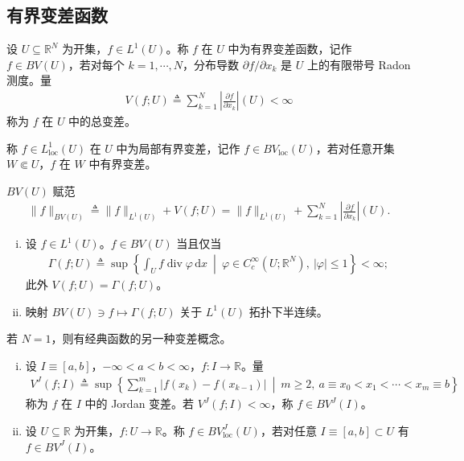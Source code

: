 \documentclass[../../main.tex]{subfiles}%
\begin{document}
\subsection{有界变差函数}\label{subsection:ch03-BV}

\begin{definition}\label{definition:ch03-BV}
设 $U\subseteq\mathbb{R}^N$ 为开集，$f\in L^1(U)$。称 $f$ 在 $U$ 中为有界变差函数，记作 $f\in BV(U)$，若对每个 $k=1,\cdots ,N$，分布导数 $\partial f/\partial x_k$ 是 $U$ 上的有限带号 Radon 测度。量
\begin{align}
V(f;U)\triangleq \sum_{k=1}^N\left|\frac{\partial f}{\partial x_k}\right|(U)<\infty\label{align:ch03-3.13}
\end{align}
称为 $f$ 在 $U$ 中的总变差。

称 $f\in L^1_{\mathrm{loc}}(U)$ 在 $U$ 中为局部有界变差，记作 $f\in BV_{\mathrm{loc}}(U)$，若对任意开集 $W\Subset U$，$f$ 在 $W$ 中有界变差。

$BV(U)$ 赋范
\begin{align*}
\|f\|_{BV(U)}\triangleq \|f\|_{L^1(U)}+V(f;U)
=\|f\|_{L^1(U)}+\sum_{k=1}^N\left|\frac{\partial f}{\partial x_k}\right|(U).
\end{align*}
\end{definition}

\begin{remark}\label{remark:ch03-BV等价}
\label{remark:ch03-3.1.4}
\begin{enumerate}[(i)]
\item 设 $f\in L^1(U)$。$f\in BV(U)$ 当且仅当
\begin{align*}
\Gamma(f;U)\triangleq \sup\left\{\int_U f\operatorname{div}\varphi\,\mathrm{d}x\ \middle|\ \varphi\in C^\infty_c(U;\mathbb{R}^N),\ |\varphi|\leqslant1\right\}<\infty;
\end{align*}
此外 $V(f;U)=\Gamma(f;U)$。
\item 映射 $BV(U)\ni f\mapsto\Gamma(f;U)$ 关于 $L^1(U)$ 拓扑下半连续。
\end{enumerate}
\end{remark}

若 $N=1$，则有经典函数的另一种变差概念。

\begin{definition}\label{definition:ch03-Jordan变差}
\begin{enumerate}[(i)]
\item 设 $I\equiv[a,b]$，$-\infty<a<b<\infty$，$f:I\to\mathbb{R}$。量
\begin{align}
V^J(f;I)\triangleq \sup\left\{\sum_{k=1}^m|f(x_k)-f(x_{k-1})|\ \middle|\ m\geqslant2,\ a\equiv x_0<x_1<\cdots<x_m\equiv b\right\}\label{align:ch03-3.14}
\end{align}
称为 $f$ 在 $I$ 中的 Jordan 变差。若 $V^J(f;I)<\infty$，称 $f\in BV^J(I)$。
\item 设 $U\subseteq\mathbb{R}$ 为开集，$f:U\to\mathbb{R}$。称 $f\in BV^J_{\mathrm{loc}}(U)$，若对任意 $I\equiv[a,b]\subset U$ 有 $f\in BV^J(I)$。
\end{enumerate}
\end{definition}
\end{document}
